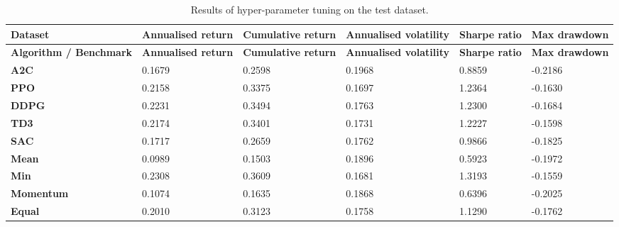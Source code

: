 \begin{longtable}{|p{2cm}|p{2.1cm}|p{2.1cm}|p{2.1cm}|p{1.5cm}|p{2cm}|}
    \caption{Results of hyper-parameter tuning on the test dataset.}
    \label{tab:test_results}
    \\ 
    \hline
    \textbf{Dataset} & \textbf{Annualised return} & \textbf{Cumulative return} & \textbf{Annualised volatility} & \textbf{Sharpe ratio} & \textbf{Max drawdown}  \\ \midrule
    \endfirsthead

    \hline
    \textbf{Algorithm / Benchmark} & \textbf{Annualised return} & \textbf{Cumulative return} & \textbf{Annualised volatility} & \textbf{Sharpe ratio} & \textbf{Max drawdown}  \\ \midrule
    \endhead

    \endfoot
    \hline

    \textbf{A2C} & 0.1679 & 0.2598 & 0.1968 & 0.8859 & -0.2186 \\ \hline
    \textbf{PPO} & 0.2158 & 0.3375 & 0.1697 & 1.2364 & -0.1630 \\ \hline
    \textbf{DDPG} & 0.2231 & 0.3494 & 0.1763 & 1.2300 & -0.1684 \\ \hline
    \textbf{TD3} & 0.2174 & 0.3401 & 0.1731 & 1.2227 & -0.1598 \\ \hline
    \textbf{SAC} & 0.1717 & 0.2659 & 0.1762 & 0.9866 & -0.1825 \\ \hline
    \textbf{Mean} & 0.0989 & 0.1503 & 0.1896 & 0.5923 & -0.1972 \\ \hline
    \textbf{Min} & 0.2308 & 0.3609 & 0.1681 & 1.3193 & -0.1559 \\ \hline
    \textbf{Momentum} & 0.1074 & 0.1635 & 0.1868 & 0.6396 & -0.2025 \\ \hline
    \textbf{Equal} & 0.2010 & 0.3123 & 0.1758 & 1.1290 & -0.1762 \\ \hline
\end{longtable}